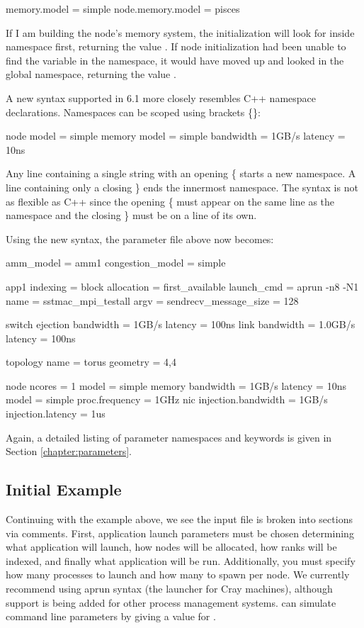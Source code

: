 \begin{ViFile}
memory.model = simple
node.memory.model = pisces
\end{ViFile}
If I am building the node's memory system, the initialization will look for  inside namespace  first, returning the value .
If node initialization had been unable to find the variable in the  namespace,
it would have moved up and looked in the global namespace, returning the value .

A new syntax supported in 6.1 more closely resembles C++ namespace declarations. 
Namespaces can be scoped using brackets \{\}:

\begin{ViFile}
node {
 model = simple
 memory {
   model = simple
   bandwidth = 1GB/s
   latency = 10ns
 }
}
\end{ViFile}
Any line containing a single string with an opening \{ starts a new namespace.
A line containing only a closing \} ends the innermost namespace.
The syntax is not as flexible as C++ since the opening \{ must appear on the same line as the namespace and the closing \} must be on a line of its own.

Using the new syntax, the parameter file above now becomes:

\begin{ViFile}
amm_model = amm1
congestion_model = simple

app1 {
 indexing = block
 allocation = first_available
 launch_cmd = aprun -n8 -N1
 name = sstmac_mpi_testall
 argv =
 sendrecv_message_size = 128
}

switch {
 ejection {
  bandwidth = 1GB/s
  latency = 100ns
 }
 link {
  bandwidth = 1.0GB/s
  latency = 100ns
 }
}

topology {
 name = torus
 geometry = 4,4
}

node {
 ncores = 1
 model = simple
 memory {
  bandwidth = 1GB/s
  latency = 10ns
  model = simple
 }
 proc.frequency = 1GHz
 nic {
  injection.bandwidth = 1GB/s
  injection.latency = 1us
 }
}
\end{ViFile}
Again, a detailed listing of parameter namespaces and keywords is given in Section \ref{chapter:parameters}.

\subsection{Initial Example}
\label{subsec:initialExample}
Continuing with the example above, we see the input file is broken into sections via comments.  
First, application launch parameters must be chosen determining what application will launch, 
how nodes will be allocated, how ranks will be indexed, and finally what application will be run.  
Additionally, you must specify how many processes to launch and how many to spawn per node.  
We currently recommend using aprun syntax (the launcher for Cray machines), 
although support is being added for other process management systems.
\sstmacro can simulate command line parameters by giving a value for .

